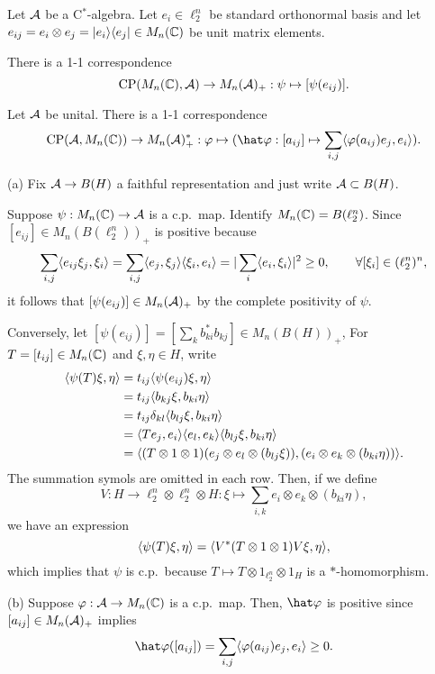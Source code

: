 \documentclass{../../small}
\begin{document}
\begin{thm}
Let $\mathcal{A}$ be a C$^*$-algebra.
Let $e_i\in\ell_2^n$ be standard orthonormal basis and let $e_{ij}=e_i\otimes e_j=|e_i\rangle\langle e_j|\in M_n(\mathbb{C})$ be unit matrix elements.
\begin{parts}
\item
There is a 1-1 correspondence
\[\mathrm{CP}(M_n(\mathbb{C}),\mathcal{A})\to M_n(\mathcal{A})_+:\psi\mapsto[\psi(e_{ij})].\]
\item
Let $\mathcal{A}$ be unital.
There is a 1-1 correspondence
\[\mathrm{CP}(\cA,M_n(\C))\to M_n(\cA)^*_+:\f\mapsto(\hat\f:[a_{ij}]\mapsto\sum_{i,j}\<\f(a_{ij})e_j,e_i\>).\]
\end{parts}
\end{thm}
\begin{pf}
(a)
Fix $\mathcal{A}\to B(H)$ a faithful representation and just write $\mathcal{A}\subset B(H)$.

Suppose $\psi:M_n(\mathbb{C})\to\mathcal{A}$ is a c.p.~map.
Identify $M_n(\mathbb{C})=B(\ell_2^n)$.
Since $[e_{ij}]\in M_n(B(\ell_2^n))_+$ is positive because
\[\sum_{i,j}\langle e_{ij}\xi_j,\xi_i\rangle=\sum_{i,j}\langle e_j,\xi_j\rangle\langle\xi_i,e_i\rangle=|\sum_i\langle e_i,\xi_i\rangle|^2\ge0,\qquad\forall[\xi_i]\in(\ell_2^n)^n,\]
it follows that $[\psi(e_{ij})]\in M_n(\mathcal{A})_+$ by the complete positivity of $\psi$.

Conversely, let $[\psi(e_{ij})]=[\sum_kb_{ki}^*b_{kj}]\in M_n(B(H))_+$,
For $T=[t_{ij}]\in M_n(\mathbb{C})$ and $\xi,\eta\in H$, write
\begin{align*}
\langle\psi(T)\xi,\eta\rangle
&=t_{ij}\langle\psi(e_{ij})\xi,\eta\rangle\\
&=t_{ij}\langle b_{kj}\xi,b_{ki}\eta\rangle\\
&=t_{ij}\delta_{kl}\langle b_{lj}\xi,b_{ki}\eta\rangle\\
&=\langle Te_j,e_i\rangle\langle e_l,e_k\rangle\langle b_{lj}\xi,b_{ki}\eta\rangle\\
&=\langle(T\otimes1\otimes1)(e_j\otimes e_l\otimes(b_{lj}\xi)),(e_i\otimes e_k\otimes(b_{ki}\eta))\rangle.
\end{align*}
The summation symols are omitted in each row.
Then, if we define
\[V:H\to\ell_2^n\otimes\ell_2^n\otimes H:\xi\mapsto\sum_{i,k}e_i\otimes e_k\otimes(b_{ki}\eta),\]
we have an expression
\[\langle\psi(T)\xi,\eta\rangle=\langle V^*(T\otimes1\otimes1)V\xi,\eta\rangle,\]
which implies that $\psi$ is c.p.~because $T\mapsto T\otimes1_{\ell_2^n}\otimes1_H$ is a $*$-homomorphism.

(b)
Suppose $\varphi:\mathcal{A}\to M_n(\mathbb{C})$ is a c.p.~map.
Then, $\hat\f$ is positive since $[a_{ij}]\in M_n(\mathcal{A})_+$ implies
\[\hat\f([a_{ij}])=\sum_{i,j}\<\f(a_{ij})e_j,e_i\>\ge0.\]


\end{pf}
\end{document}

